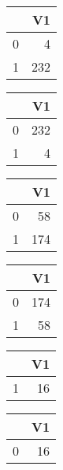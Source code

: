 \bigskip\bigskip
\centering
\begin{tabular}{rr}
  \hline
 & V1 \\ 
  \hline
0 &   4 \\ 
  1 & 232 \\ 
   \hline
\end{tabular}

\bigskip\bigskip
\centering
\begin{tabular}{rr}
  \hline
 & V1 \\ 
  \hline
0 & 232 \\ 
  1 &   4 \\ 
   \hline
\end{tabular}

\bigskip\bigskip
\centering
\begin{tabular}{rr}
  \hline
 & V1 \\ 
  \hline
0 &  58 \\ 
  1 & 174 \\ 
   \hline
\end{tabular}

\bigskip\bigskip
\centering
\begin{tabular}{rr}
  \hline
 & V1 \\ 
  \hline
0 & 174 \\ 
  1 &  58 \\ 
   \hline
\end{tabular}

\bigskip\bigskip
\centering
\begin{tabular}{rr}
  \hline
 & V1 \\ 
  \hline
1 &  16 \\ 
   \hline
\end{tabular}

\bigskip\bigskip
\centering
\begin{tabular}{rr}
  \hline
 & V1 \\ 
  \hline
0 &  16 \\ 
   \hline
\end{tabular}

